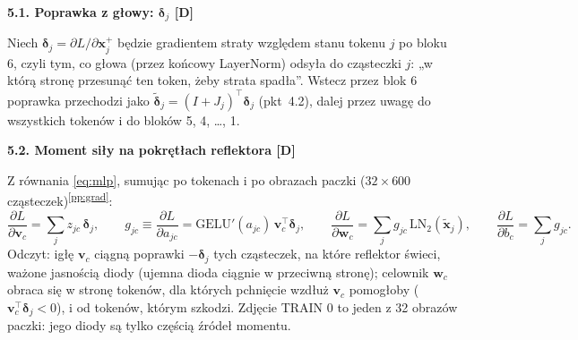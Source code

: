 \documentclass[a4paper,11pt]{article}
\newcommand{\stD}{\textcolor{dok}{\textsf{\textbf{[D]}}}}
\newcommand{\LN}{\mathrm{LN}}
\newcommand{\GELU}{\mathrm{GELU}}
\newcommand{\pp}[1]{\textsuperscript{\ref{pp:#1}}}
\newcommand{\elem}[1]{\par\medskip\noindent\textbf{#1}\par\nopagebreak}
\begin{document}
\elem{5.1. Poprawka z głowy: $\bm\delta_j$ \stD}
Niech $\bm\delta_j=\partial L/\partial\bm x^{+}_j$ będzie gradientem straty względem stanu tokenu $j$ po bloku 6, czyli tym, co głowa
(przez końcowy LayerNorm) odsyła do cząsteczki $j$: „w którą stronę przesunąć ten token, żeby strata spadła”. Wstecz przez blok 6
poprawka przechodzi jako $\tilde{\bm\delta}_j=(I+J_j)^{\!\top}\bm\delta_j$ (pkt~4.2), dalej przez uwagę do wszystkich tokenów
i do bloków 5, 4, \dots, 1.

\elem{5.2. Moment siły na pokrętłach reflektora \stD}
Z równania \eqref{eq:mlp}, sumując po tokenach i po obrazach paczki ($32\times600$ cząsteczek)\pp{grad}:
\begin{equation}
\frac{\partial L}{\partial\bm v_c}=\sum_j z_{jc}\,\bm\delta_j,\qquad
g_{jc}\equiv\frac{\partial L}{\partial a_{jc}}=\GELU'(a_{jc})\,\bm v_c^{\!\top}\bm\delta_j,\qquad
\frac{\partial L}{\partial\bm w_c}=\sum_j g_{jc}\,\LN_2(\tilde{\bm x}_j),\qquad
\frac{\partial L}{\partial b_c}=\sum_j g_{jc}.
\end{equation}
Odczyt: igłę $\bm v_c$ ciągną poprawki $-\bm\delta_j$ tych cząsteczek, na które reflektor świeci, ważone jasnością diody
(ujemna dioda ciągnie w przeciwną stronę); celownik $\bm w_c$ obraca się w stronę tokenów, dla których pchnięcie wzdłuż $\bm v_c$
pomogłoby ($\bm v_c^{\!\top}\bm\delta_j<0$), i od tokenów, którym szkodzi. Zdjęcie TRAIN 0 to jeden z 32 obrazów paczki: jego diody
są tylko częścią źródeł momentu.
\end{document}
